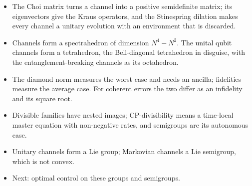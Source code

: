 \documentclass[handoutsbeamer.tex]{subfiles}
\begin{document}
\begin{frame}\mop{\small}
\begin{itemize}\setlength\itemsep{0.4em}
    \item The Choi matrix turns a channel into a positive semidefinite matrix; its eigenvectors give the Kraus operators, and the Stinespring dilation makes every channel a unitary evolution with an environment that is discarded.
    \item Channels form a spectrahedron of dimension $N^4-N^2$. The unital qubit channels form a tetrahedron, the Bell-diagonal tetrahedron in disguise, with the entanglement-breaking channels as its octahedron.
    \item The diamond norm measures the worst case and needs an ancilla; fidelities measure the average case. For coherent errors the two differ as an infidelity and its square root.
    \item Divisible families have nested images; CP-divisibility means a time-local master equation with non-negative rates, and semigroups are its autonomous case.
    \item Unitary channels form a Lie group; Markovian channels a Lie semigroup, which is not convex.
    \item Next: optimal control on these groups and semigroups.
\end{itemize}
\end{frame}

\biblio
\end{document}

